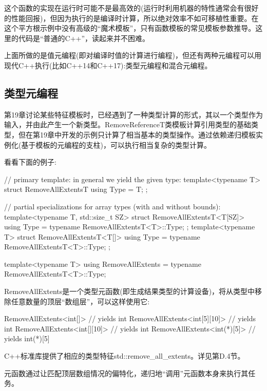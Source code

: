 这个函数的实现在运行时可能不是最高效的(运行时利用机器的特性通常会有很好的性能回报)，但因为执行的是编译时计算，所以绝对效率不如可移植性重要。在这个平方根示例中没有高级的“魔术模板”，只有函数模板的常见模板参数推导。这里的代码是“普通的C++”，读起来并不困难。

上面所做的是值元编程(即对编译时值的计算进行编程)，但还有两种元编程可以用现代C++执行(比如C++14和C++17):类型元编程和混合元编程。

\subsection{类型元编程}

第19章讨论某些特征模板时，已经遇到了一种类型计算的形式，其以一个类型作为输入，并由此产生一个新类型。RemoveReferenceT类模板计算引用类型的基础类型，但在第19章中开发的示例只计算了相当基本的类型操作。通过依赖递归模板实例化(基于模板的元编程的支柱)，可以执行相当复杂的类型计算。

看看下面的例子:

\begin{cpp}
// primary template: in general we yield the given type:
template<typename T>
struct RemoveAllExtentsT {
	using Type = T;
};

// partial specializations for array types (with and without bounds):
template<typename T, std::size_t SZ>
struct RemoveAllExtentsT<T[SZ]> {
	using Type = typename RemoveAllExtentsT<T>::Type;
};
template<typename T>
struct RemoveAllExtentsT<T[]> {
	using Type = typename RemoveAllExtentsT<T>::Type;
};

template<typename T>
using RemoveAllExtents = typename RemoveAllExtentsT<T>::Type;
\end{cpp}

RemoveAllExtents是一个类型元函数(即生成结果类型的计算设备)，将从类型中移除任意数量的顶层“数组层”，可以这样使用它:

\begin{cpp}
RemoveAllExtents<int[]> // yields int
RemoveAllExtents<int[5][10]> // yields int
RemoveAllExtents<int[][10]> // yields int
RemoveAllExtents<int(*)[5]> // yields int(*)[5]
\end{cpp}

\begin{notice}C++标准库提供了相应的类型特征std::remove\_all\_extents。详见第D.4节。
\end{notice}

元函数通过让匹配顶层数组情况的偏特化，递归地“调用”元函数本身来执行其任务。


